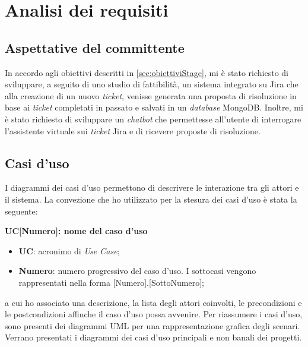 \section{Analisi dei requisiti}
\subsection{Aspettative del committente}
In accordo agli obiettivi descritti in \ref{sec:obiettiviStage}, mi è stato richiesto di sviluppare, a seguito di uno studio di fattibilità, un sistema integrato su Jira che alla creazione di un nuovo \textit{ticket}, venisse generata una proposta di risoluzione in base ai \textit{ticket} completati in passato e salvati in un \textit{database} MongoDB.
Inoltre, mi è stato richiesto di sviluppare un \textit{chatbot} che permettesse all'utente di interrogare l'assistente virtuale sui \textit{ticket} Jira e di ricevere proposte di risoluzione.

\subsection{Casi d'uso}
I diagrammi dei casi d'uso permettono di descrivere le interazione tra gli attori e il sistema.  
La convezione che ho utilizzato per la stesura dei casi d'uso è stata la seguente:
\begin{center}
    \textbf{{UC[Numero]}: nome del caso d'uso}
\end{center}
\begin{itemize}
    \item \textbf{UC}: acronimo di \textit{Use Case};
    \item \textbf{Numero}: numero progressivo del caso d'uso. I sottocasi vengono rappresentati nella forma [Numero].[SottoNumero];
\end{itemize}
a cui ho associato una descrizione, la lista degli attori coinvolti, le precondizioni e le postcondizioni affinche il caso d'uso possa avvenire.
Per riassumere i casi d'uso, sono presenti dei diagrammi UML per una rappresentazione grafica degli scenari. Verrano presentati i diagrammi dei casi d'uso principali e non banali dei progetti.

